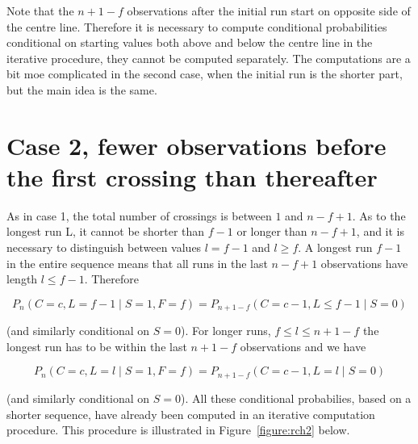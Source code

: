 Note that the $n+1-f$ observations after the initial run start on opposite side of the centre line. Therefore it is necessary to compute conditional probabilities conditional on starting values both above and below the centre line in the iterative procedure, they cannot be computed separately. The computations are a bit moe complicated in the second case, when the initial run is the shorter part, but the main idea is the same.

\section{Case 2, fewer observations before the first crossing than thereafter}

As in case 1, the total number of crossings is between $1$ and $n-f+1$. As to the longest run L, it cannot be shorter than $f-1$ or longer than $n-f+1$, and it is necessary to distinguish between values $l=f-1$ and $l \geq f$. A longest run $f-1$ in the entire sequence means that all runs in the last $n-f+1$ observations have length $l \leq f-1$. Therefore 

$$P_n (C=c,L=f-1 \mid S=1,F=f) = P_{n+1-f} (C=c-1,L \leq f-1 \mid S=0)$$ 

(and similarly conditional on $S=0$). For longer runs, $f \leq l \leq n+1-f$ the longest run has to be within the last $n+1-f$ observations and we have 

$$P_n (C=c,L=l \mid S=1,F=f) = P_{n+1-f} (C=c-1,L=l \mid S=0)$$ 

(and similarly conditional on $S = 0$). All these conditional probabilies, based on a shorter sequence, have already been computed in an iterative computation procedure. This procedure is illustrated in Figure~\ref{figure:rch2} below.

